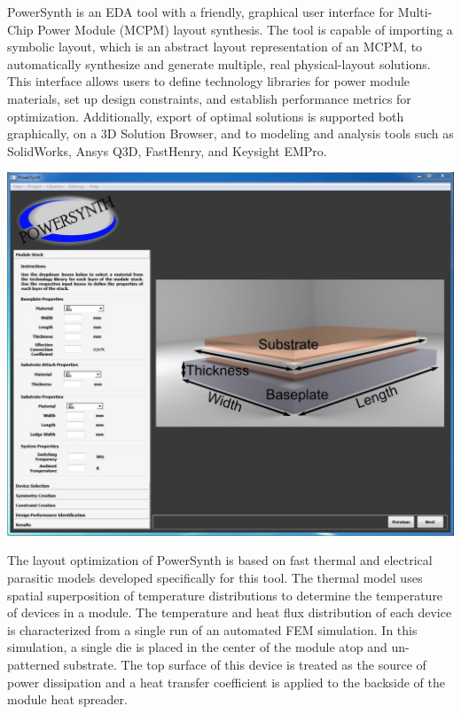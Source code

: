 \documentclass[11pt]{article}
\begin{document}
PowerSynth is an EDA tool with a friendly, graphical user interface for Multi-Chip Power Module (MCPM) layout synthesis. The tool is capable of importing a symbolic layout, which is an abstract layout representation of an MCPM, to automatically synthesize and generate multiple, real physical-layout solutions. This interface allows users to define technology libraries for power module materials, set up design constraints, and establish performance metrics for optimization. Additionally, export of optimal solutions is supported both graphically, on a 3D Solution Browser, and to modeling and analysis tools such as SolidWorks, Ansys Q3D, FastHenry, and Keysight EMPro. 

\begin{center}
\includegraphics[width=14cm]{./figs/01_PSmain.png}
\end{center}

The layout optimization of PowerSynth is based on fast thermal and electrical parasitic models developed specifically for this tool. The thermal model uses spatial superposition of temperature distributions to determine the temperature of devices in a module. The temperature and heat flux distribution of each device is characterized from a single run of an automated FEM simulation. In this simulation, a single die is placed in the center of the module atop and un-patterned substrate. The top surface of this device is treated as the source of power dissipation and a heat transfer coefficient is applied to the backside of the module heat spreader.
\end{document}
